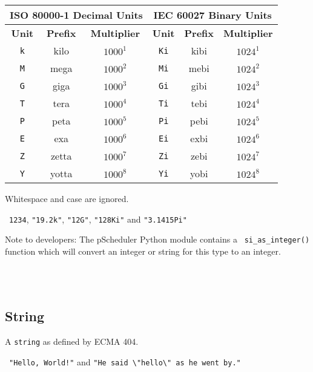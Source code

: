 \documentclass[10pt]{article}
\begin{document}
\begin{center}
  \begin{tabular}{|c|c|c|c|c|c|}
    \hline
    \multicolumn{3}{|c}{{\bf ISO 80000-1 Decimal Units}} & \multicolumn{3}{|c|}{{\bf IEC 60027 Binary Units}} \\
    \hline
    {\bf Unit} & {\bf Prefix} & {\bf Multiplier} & {\bf Unit} & {\bf Prefix} & {\bf Multiplier} \\
    \hline
    {\tt k} & kilo & $1000^{1}$ & {\tt Ki} & kibi & $1024^{1}$ \\
    {\tt M} & mega & $1000^{2}$ & {\tt Mi} & mebi & $1024^{2}$ \\
    {\tt G} & giga & $1000^{3}$ & {\tt Gi} & gibi & $1024^{3}$ \\
    {\tt T} & tera & $1000^{4}$ & {\tt Ti} & tebi & $1024^{4}$ \\
    {\tt P} & peta & $1000^{5}$ & {\tt Pi} & pebi & $1024^{5}$ \\
    {\tt E} & exa & $1000^{6}$ & {\tt Ei} & exbi & $1024^{6}$ \\
    {\tt Z} & zetta & $1000^{7}$ & {\tt Zi} & zebi & $1024^{7}$ \\
    {\tt Y} & yotta & $1000^{8}$ & {\tt Yi} & yobi & $1024^{8}$ \\
    \hline
  \end{tabular}
\end{center}

Whitespace and case are ignored.

\example\ {\tt 1234},  {\tt "19.2k"}, {\tt "12G"}, {\tt "128Ki"} and {\tt "3.1415Pi"}

Note to developers: The pScheduler Python module contains a {\tt
  si_as_integer()} function which will convert an integer or string
for this type to an integer.

\\
\\



\subsection{String}
A {\tt string} as defined by ECMA 404.

\example\ {\tt "Hello, World!"} and {\tt "He said
  \textbackslash"hello\textbackslash" as he went by."}
\end{document}
